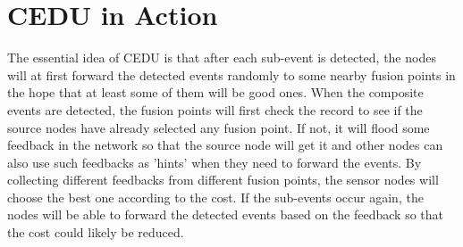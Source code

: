 \section{CEDU in Action}
\label{sec:cedu}
The essential idea of CEDU is that after each sub-event is detected, the nodes will at first forward the detected events randomly to some nearby fusion points in the hope that at least some of them will be good ones. When the composite events are detected, the fusion points will first check the record to see if the source nodes have already selected any fusion point. If not, it will flood some feedback in the network so that the source node will get it and other nodes can also use such feedbacks as 'hints' when they need to forward the events. By collecting different feedbacks from different fusion points, the sensor nodes will choose the best one according to the cost. If the sub-events occur again, the nodes will be able to forward the detected events based on the feedback so that the cost could likely be reduced.

